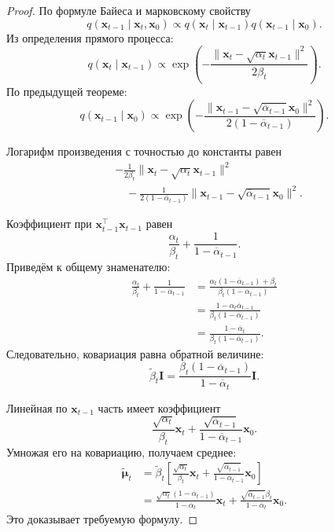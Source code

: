 \documentclass[12pt,a4paper]{article}
\theoremstyle{definition}
\newcommand{\1}{\mathbf{1}}
\begin{document}
\begin{proof}
По формуле Байеса и марковскому свойству
\[
    q(\bm{x}_{t-1}\mid\bm{x}_t,\bm{x}_0)
    \propto
    q(\bm{x}_t\mid\bm{x}_{t-1})
    q(\bm{x}_{t-1}\mid\bm{x}_0).
\]
Из определения прямого процесса:
\[
    q(\bm{x}_t\mid\bm{x}_{t-1})
    \propto
    \exp\left(
        -
        \frac{
            \|\bm{x}_t-\sqrt{\alpha_t}\bm{x}_{t-1}\|^2
        }{
            2\beta_t
        }
    \right).
\]
По предыдущей теореме:
\[
    q(\bm{x}_{t-1}\mid\bm{x}_0)
    \propto
    \exp\left(
        -
        \frac{
            \|\bm{x}_{t-1}
            -\sqrt{\overline{\alpha}_{t-1}}\bm{x}_0\|^2
        }{
            2(1-\overline{\alpha}_{t-1})
        }
    \right).
\]

Логарифм произведения с точностью до константы равен
\begin{align*}
    &-
    \frac{1}{2\beta_t}
    \|\bm{x}_t-\sqrt{\alpha_t}\bm{x}_{t-1}\|^2\\
    &\quad
    -
    \frac{1}{2(1-\overline{\alpha}_{t-1})}
    \|\bm{x}_{t-1}
    -\sqrt{\overline{\alpha}_{t-1}}\bm{x}_0\|^2.
\end{align*}

Коэффициент при
$\bm{x}_{t-1}^{\top}\bm{x}_{t-1}$ равен
\[
    \frac{\alpha_t}{\beta_t}
    +
    \frac{1}{1-\overline{\alpha}_{t-1}}.
\]
Приведём к общему знаменателю:
\begin{align*}
    \frac{\alpha_t}{\beta_t}
    +
    \frac{1}{1-\overline{\alpha}_{t-1}}
    &=
    \frac{
        \alpha_t(1-\overline{\alpha}_{t-1})+\beta_t
    }{
        \beta_t(1-\overline{\alpha}_{t-1})
    }\\
    &=
    \frac{
        1-\alpha_t\overline{\alpha}_{t-1}
    }{
        \beta_t(1-\overline{\alpha}_{t-1})
    }\\
    &=
    \frac{
        1-\overline{\alpha}_t
    }{
        \beta_t(1-\overline{\alpha}_{t-1})
    }.
\end{align*}
Следовательно, ковариация равна обратной величине:
\[
    \widetilde{\beta}_t\bm{I}
    =
    \frac{
        \beta_t(1-\overline{\alpha}_{t-1})
    }{
        1-\overline{\alpha}_t
    }\bm{I}.
\]

Линейная по $\bm{x}_{t-1}$ часть имеет коэффициент
\[
    \frac{\sqrt{\alpha_t}}{\beta_t}\bm{x}_t
    +
    \frac{
        \sqrt{\overline{\alpha}_{t-1}}
    }{
        1-\overline{\alpha}_{t-1}
    }\bm{x}_0.
\]
Умножая его на ковариацию, получаем среднее:
\begin{align*}
    \widetilde{\bm{\mu}}_t
    &=
    \widetilde{\beta}_t
    \left[
        \frac{\sqrt{\alpha_t}}{\beta_t}\bm{x}_t
        +
        \frac{
            \sqrt{\overline{\alpha}_{t-1}}
        }{
            1-\overline{\alpha}_{t-1}
        }\bm{x}_0
    \right]\\
    &=
    \frac{
        \sqrt{\alpha_t}
        (1-\overline{\alpha}_{t-1})
    }{
        1-\overline{\alpha}_t
    }\bm{x}_t
    +
    \frac{
        \sqrt{\overline{\alpha}_{t-1}}\beta_t
    }{
        1-\overline{\alpha}_t
    }\bm{x}_0.
\end{align*}
Это доказывает требуемую формулу.
\end{proof}
\end{document}
